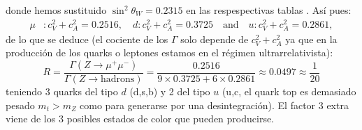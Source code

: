 donde hemos sustituido $\sin^2 \theta_W = 0.2315$ en las respespectivas tablas \cite{SaboridoSilva2025ParticlePhysicsI,thomson_modern_physics}. Así pues: 
\begin{align*}
\mu &: c_V^2 + c_A^2 = 0.2516, \quad
d : c_V^2 + c_A^2 = 0.3725 \quad \text{and} \quad
u : c_V^2 + c_A^2 = 0.2861,
\end{align*}
de lo que se deduce (el cociente de los $\Gamma$ solo depende de $c_V^2 + c_A^2$ ya que en la producción de los quarks o leptones estamos en el régimen ultrarrelativista): 
\begin{equation}
	R = \frac{\Gamma(Z \to \mu^+ \mu^-)}{\Gamma(Z \to \text{hadrons})} = \frac{0.2516}{9 \times 0.3725 + 6 \times 0.2861} \approx 0.0497 \approx \frac{1}{20}
\end{equation}
teniendo $3$ quarks del tipo $d$ (d,s,b) y 2 del tipo $u$ (u,c, el quark top es demasiado pesado $m_t >m_Z$ como para generarse por una desintegración). El factor 3 extra viene de los 3 posibles estados de color que pueden producirse. 



